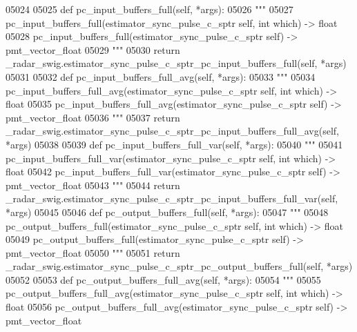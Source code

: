 \begin{DoxyCode}
{{{{{{{{{{{{{{{{{05024 
05025     \textcolor{keyword}{def }pc_input_buffers_full(self, *args):
05026         \textcolor{stringliteral}{"""}
05027 \textcolor{stringliteral}{        pc\_input\_buffers\_full(estimator\_sync\_pulse\_c\_sptr self, int which) -> float}
05028 \textcolor{stringliteral}{        pc\_input\_buffers\_full(estimator\_sync\_pulse\_c\_sptr self) -> pmt\_vector\_float}
05029 \textcolor{stringliteral}{        """}
05030         \textcolor{keywordflow}{return} \_radar\_swig.estimator\_sync\_pulse\_c\_sptr\_pc\_input\_buffers\_full(self, *args)
05031 
05032     \textcolor{keyword}{def }pc_input_buffers_full_avg(self, *args):
05033         \textcolor{stringliteral}{"""}
05034 \textcolor{stringliteral}{        pc\_input\_buffers\_full\_avg(estimator\_sync\_pulse\_c\_sptr self, int which) -> float}
05035 \textcolor{stringliteral}{        pc\_input\_buffers\_full\_avg(estimator\_sync\_pulse\_c\_sptr self) -> pmt\_vector\_float}
05036 \textcolor{stringliteral}{        """}
05037         \textcolor{keywordflow}{return} \_radar\_swig.estimator\_sync\_pulse\_c\_sptr\_pc\_input\_buffers\_full\_avg(self, *args)
05038 
05039     \textcolor{keyword}{def }pc_input_buffers_full_var(self, *args):
05040         \textcolor{stringliteral}{"""}
05041 \textcolor{stringliteral}{        pc\_input\_buffers\_full\_var(estimator\_sync\_pulse\_c\_sptr self, int which) -> float}
05042 \textcolor{stringliteral}{        pc\_input\_buffers\_full\_var(estimator\_sync\_pulse\_c\_sptr self) -> pmt\_vector\_float}
05043 \textcolor{stringliteral}{        """}
05044         \textcolor{keywordflow}{return} \_radar\_swig.estimator\_sync\_pulse\_c\_sptr\_pc\_input\_buffers\_full\_var(self, *args)
05045 
05046     \textcolor{keyword}{def }pc_output_buffers_full(self, *args):
05047         \textcolor{stringliteral}{"""}
05048 \textcolor{stringliteral}{        pc\_output\_buffers\_full(estimator\_sync\_pulse\_c\_sptr self, int which) -> float}
05049 \textcolor{stringliteral}{        pc\_output\_buffers\_full(estimator\_sync\_pulse\_c\_sptr self) -> pmt\_vector\_float}
05050 \textcolor{stringliteral}{        """}
05051         \textcolor{keywordflow}{return} \_radar\_swig.estimator\_sync\_pulse\_c\_sptr\_pc\_output\_buffers\_full(self, *args)
05052 
05053     \textcolor{keyword}{def }pc_output_buffers_full_avg(self, *args):
05054         \textcolor{stringliteral}{"""}
05055 \textcolor{stringliteral}{        pc\_output\_buffers\_full\_avg(estimator\_sync\_pulse\_c\_sptr self, int which) -> float}
05056 \textcolor{stringliteral}{        pc\_output\_buffers\_full\_avg(estimator\_sync\_pulse\_c\_sptr self) -> pmt\_vector\_float}
}}}}}}}}}}}}}}}}}
\end{DoxyCode}
